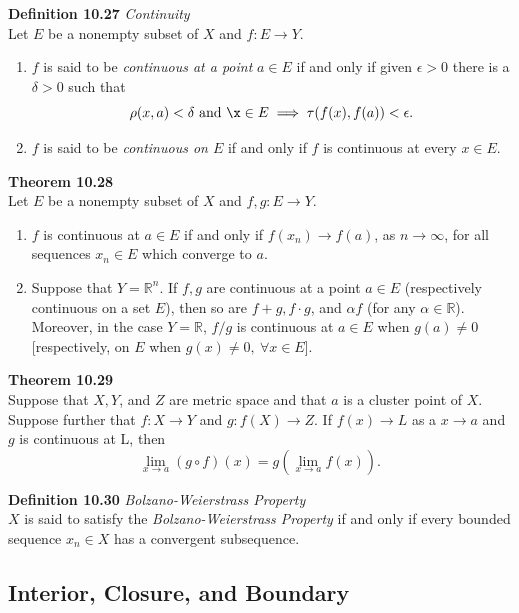 \documentclass[8pt,landscape]{article}
\begin{document}
\begin{multicols}{3}
\begin{enumerate}
\end{enumerate}

\textbf{Definition 10.27} \emph{Continuity} \\
Let $E$ be a nonempty subset of $X$ and $f : E \to Y$.
\begin{enumerate}
    \item $f$ is said to be \emph{continuous at a point} $a \in E$ if and only if
        given $\epsilon > 0$ there is a $\delta > 0$ such that
        \[
            \rho (x, a) < \delta \ \text{and} \ \x \in E \implies
            \tau (f(x), f(a)) < \epsilon.
        \]
    \item $f$ is said to be \emph{continuous on $E$} if and only if $f$ is
        continuous at every $x \in E$.
\end{enumerate}

\textbf{Theorem 10.28} \\
Let $E$ be a nonempty subset of $X$ and $f, g : E \to Y$.
\begin{enumerate}
    \item $f$ is continuous at $a \in E$ if and only if $f(x_n) \to f(a)$,
        as $n \to \infty$, for all sequences $x_n \in E$ which converge to $a$.
    \item Suppose that $Y = \mathbb{R}^n$.
        If $f, g$ are continuous at a point $a \in E$ (respectively continuous on
        a set $E$), then so are $f+g, f \cdot g$, and $\alpha f$
        (for any $\alpha \in \mathbb{R}$).
        Moreover, in the case $Y = \mathbb{R}$, $f/g$ is continuous at $a \in E$
        when $g(a) \neq 0$ [respectively, on $E$ when $g(x) \neq 0,
        \ \forall x \in E$].
\end{enumerate}

\textbf{Theorem 10.29} \\
Suppose that $X, Y$, and $Z$ are metric space and that $a$ is a cluster point of $X$.
Suppose further that $f : X \to Y$ and $g : f(X) \to Z$.
If $f(x) \to L$ as a $x \to a$ and $g$ is continuous at L, then
\[
    \lim_{x \to a} (g \circ f) (x) = g \left( \lim_{x \to a} f(x) \right).
\]

\textbf{Definition 10.30} \emph{Bolzano-Weierstrass Property} \\
$X$ is said to satisfy the \emph{Bolzano-Weierstrass Property} if and only if every
bounded sequence $x_n \in X$ has a convergent subsequence.

\subsection{Interior, Closure, and Boundary}


\end{multicols}
\end{document}
